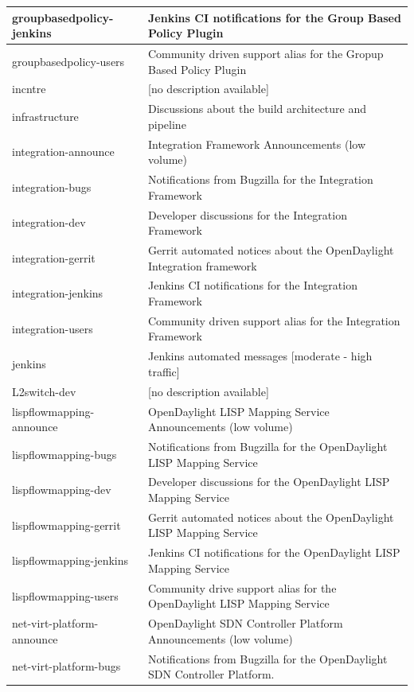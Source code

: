\documentclass[a4paper, 12pt]{book}
\begin{document}
\begin{longtable}{|p{4cm}|p{10cm}|}
groupbasedpolicy-jenkins &	Jenkins CI notifications for the Group Based Policy Plugin \\ \hline
groupbasedpolicy-users &	Community driven support alias for the Gropup Based Policy Plugin \\ \hline
incntre &	[no description available] \\ \hline
infrastructure &	Discussions about the build architecture and pipeline \\ \hline
integration-announce &	Integration Framework Announcements (low volume) \\ \hline
integration-bugs &	Notifications from Bugzilla for the Integration Framework \\ \hline
integration-dev &	Developer discussions for the Integration Framework \\ \hline
integration-gerrit &	Gerrit automated notices about the OpenDaylight Integration framework \\ \hline
integration-jenkins &	Jenkins CI notifications for the Integration Framework \\ \hline
integration-users &	Community driven support alias for the Integration Framework \\ \hline
jenkins &	Jenkins automated messages [moderate - high traffic] \\ \hline
L2switch-dev &	[no description available] \\ \hline
lispflowmapping-announce &	OpenDaylight LISP Mapping Service Announcements (low volume) \\ \hline
lispflowmapping-bugs &	Notifications from Bugzilla for the OpenDaylight LISP Mapping Service \\ \hline
lispflowmapping-dev &	Developer discussions for the OpenDaylight LISP Mapping Service \\ \hline
lispflowmapping-gerrit &	Gerrit automated notices about the OpenDaylight LISP Mapping Service \\ \hline
lispflowmapping-jenkins &	Jenkins CI notifications for the OpenDaylight LISP Mapping Service \\ \hline
lispflowmapping-users &	Community drive support alias for the OpenDaylight LISP Mapping Service \\ \hline
net-virt-platform-announce &	OpenDaylight SDN Controller Platform Announcements (low volume) \\ \hline
net-virt-platform-bugs &	Notifications from Bugzilla for the OpenDaylight SDN Controller Platform. \\ \hline

\end{longtable}
\end{document}
